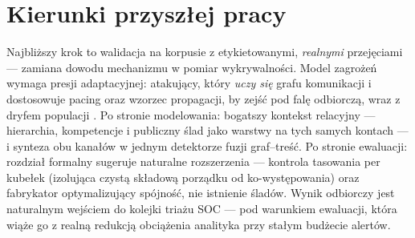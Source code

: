 \section{Kierunki przyszłej pracy}
\label{sec:z-przyszla}

Najbliższy krok to walidacja na korpusie z etykietowanymi,
\emph{realnymi} przejęciami --- zamiana dowodu mechanizmu
w pomiar wykrywalności. Model zagrożeń wymaga presji
adaptacyjnej: atakujący, który \emph{uczy się} grafu komunikacji
i dostosowuje pacing oraz wzorzec propagacji, by zejść pod falę
odbiorczą, wraz z dryfem populacji \citep{pendlebury2019tesseract}.
Po stronie modelowania: bogatszy kontekst relacyjny --- hierarchia,
kompetencje i publiczny ślad jako warstwy na tych samych kontach ---
i synteza obu kanałów w jednym detektorze fuzji graf--treść.
Po stronie ewaluacji: rozdział formalny sugeruje naturalne
rozszerzenia --- kontrola tasowania per kubełek (izolująca
czystą składową porządku od ko-występowania) oraz fabrykator
optymalizujący spójność, nie istnienie śladów. Wynik odbiorczy
jest naturalnym wejściem do kolejki triażu SOC --- pod warunkiem
ewaluacji, która wiąże go z realną redukcją obciążenia analityka
przy stałym budżecie alertów.
